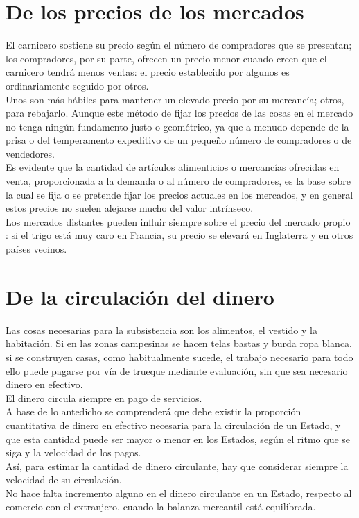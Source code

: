 \documentclass[10pt]{article}
\begin{document}
\begin{multicols}{1}
\section*{De los precios de los mercados}
El carnicero sostiene su precio según el número de compradores que se presentan; los compradores, por su parte, ofrecen un precio menor cuando creen que el carnicero tendrá menos ventas: el precio establecido por algunos es ordinariamente seguido por otros.\\
Unos son más hábiles para mantener un elevado precio por su mercancía; otros, para rebajarlo. Aunque este método de fijar los precios de las cosas en el mercado no tenga ningún fundamento justo o geométrico, ya que a menudo depende de la prisa o del temperamento expeditivo de un pequeño número de compradores o de vendedores.\\
Es evidente que la cantidad de artículos alimenticios o mercancías ofrecidas en venta, proporcionada a la demanda o al número de compradores, es la base sobre la cual se fija o se pretende fijar los precios actuales en los mercados, y en general estos precios no suelen alejarse mucho del valor intrínseco.\\
Los mercados distantes pueden influir siempre sobre el precio del mercado propio : si el trigo está muy caro en Francia, su precio se elevará en Inglaterra y en otros países vecinos.
\section*{De la circulación del dinero}
Las cosas necesarias para la subsistencia son los alimentos, el vestido y la habitación.
Si en las zonas campesinas se hacen telas bastas y burda ropa blanca, si se construyen casas, como habitualmente sucede, el trabajo necesario para todo ello puede pagarse por vía de trueque mediante evaluación, sin que sea necesario dinero en efectivo.\\
El dinero circula siempre en pago de servicios.\\
A base de lo antedicho se comprenderá que debe existir la proporción cuantitativa de dinero en efectivo necesaria para la circulación de un Estado, y que esta cantidad puede ser mayor o menor en los Estados, según el ritmo que se siga y la velocidad de los pagos.\\
Así, para estimar la cantidad de dinero circulante, hay que considerar siempre la velocidad de su circulación.\\
No hace falta incremento alguno en el dinero circulante en un Estado, respecto al comercio con el extranjero, cuando la balanza mercantil está equilibrada.

\end{multicols}
\end{document}
